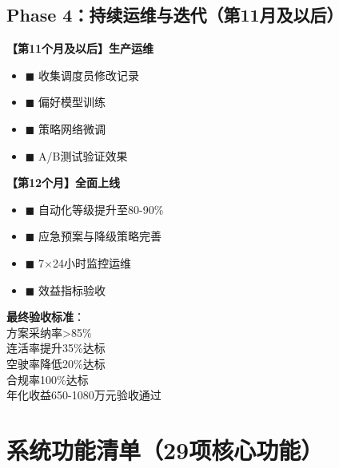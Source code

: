\documentclass[12pt,a4paper]{article}
\begin{document}
\vspace{0.5cm}

\subsection{Phase 4：持续运维与迭代（第11月及以后）}

\begin{tcolorbox}[colback=orange!5!white,colframe=orange!75!black,title=\textbf{阶段目标：系统全面上线，持续优化迭代}]

\textbf{【第11个月及以后】生产运维}

\begin{itemize}[label={}, leftmargin=*, itemsep=3pt]
    \item \textcolor{orange!70!black}{$\blacksquare$} 收集调度员修改记录
    \item \textcolor{orange!70!black}{$\blacksquare$} 偏好模型训练
    \item \textcolor{orange!70!black}{$\blacksquare$} 策略网络微调
    \item \textcolor{orange!70!black}{$\blacksquare$} A/B测试验证效果
\end{itemize}

\textbf{【第12个月】全面上线}

\begin{itemize}[label={}, leftmargin=*, itemsep=3pt]
    \item \textcolor{orange!70!black}{$\blacksquare$} 自动化等级提升至80-90\%
    \item \textcolor{orange!70!black}{$\blacksquare$} 应急预案与降级策略完善
    \item \textcolor{orange!70!black}{$\blacksquare$} 7$\times$24小时监控运维
    \item \textcolor{orange!70!black}{$\blacksquare$} 效益指标验收
\end{itemize}

\vspace{0.3cm}
\colorbox{yellow!30}{\parbox{0.95\linewidth}{
\textbf{最终验收标准}：\\
\checkmark 方案采纳率>85\%\\
\checkmark 连活率提升35\%达标\\
\checkmark 空驶率降低20\%达标\\
\checkmark 合规率100\%达标\\
\checkmark 年化收益650-1080万元验收通过
}}
\end{tcolorbox}

\section{系统功能清单（29项核心功能）}
\end{document}
